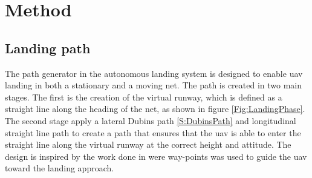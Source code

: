 \part{Method}

\chapter{Landing path}\label{Ch:LandingPath}
The path generator in the  autonomous landing system is designed to enable \gls{uav} landing in both a stationary and a moving net. The path is created in two main stages. The first is the creation of the virtual runway, which is defined as a straight line along the heading of the net, as shown in figure \ref{Fig:LandingPhase}. The second stage apply a lateral Dubins path \ref{S:DubinsPath} and longitudinal straight line path to create a path that ensures that the \gls{uav} is able to enter the straight line along the virtual runway at the correct height and attitude. The design is inspired by the work done in \citep{Skulstad&Syversen} were way-points was used to guide the \gls{uav} toward the landing approach.
